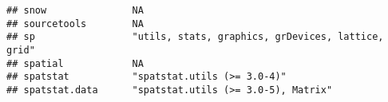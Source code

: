 \documentclass[
]{article}
\begin{document}
\begin{verbatim}
## snow               NA                                                                                                                                                                                                                                                                                                                                                                                                                                           
## sourcetools        NA                                                                                                                                                                                                                                                                                                                                                                                                                                           
## sp                 "utils, stats, graphics, grDevices, lattice, grid"                                                                                                                                                                                                                                                                                                                                                                                           
## spatial            NA                                                                                                                                                                                                                                                                                                                                                                                                                                           
## spatstat           "spatstat.utils (>= 3.0-4)"                                                                                                                                                                                                                                                                                                                                                                                                                  
## spatstat.data      "spatstat.utils (>= 3.0-5), Matrix"                                                                                                                                                                                                                                                                                                                                                                                                          

\end{verbatim}
\end{document}

